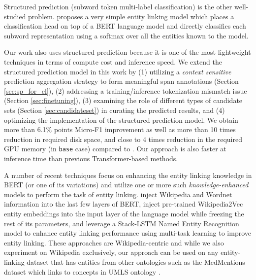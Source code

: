 \documentclass[11pt]{article}
\begin{document}
Structured prediction (subword token multi-label classification) is the other well-studied problem. 
\citet{K19-1063} proposes a very simple entity linking model which places a classification head on top of a BERT language model and directly classifies each subword representation using a softmax over all the entities known to the model. 

Our work also uses structured prediction because it is one of the most lightweight techniques in terms of compute cost and inference speed. We extend the structured prediction model in this work by (1) utilizing a \textit{context sensitive} prediction aggregation strategy to form meaningful span annotations (Section \ref{sec:sp_for_el}), (2) addressing a training/inference tokenization mismatch issue (Section \ref{sec:finetuning}), (3) examining the role of different types of candidate sets (Section \ref{sec:candidateset}) in curating the predicted results, and (4) optimizing the implementation of the structured prediction model. We obtain more than 6.1\% points Micro-F1 improvement as well as more than 10 times reduction in required disk space, and close to 4 times reduction in the required GPU memory (in \texttt{base} case) compared to \citet{K19-1063}. Our approach is also faster at inference time than previous Transformer-based methods.

A number of recent techniques focus on enhancing the entity linking knowledge in BERT (or one of its variations) and utilize one or more such \textit{knowledge-enhanced} models to perform the task of entity linking. \citet{D19-1005} inject Wikipedia and Wordnet information into the last few layers of BERT, \citet{2020.findings-emnlp.71} inject pre-trained Wikipedia2Vec \cite{Wikipedia2Vec} entity embeddings into the input layer of the language model while freezing the rest of its parameters, and \citet{P19-2026} leverage a Stack-LSTM \cite{P15-1033} Named Entity Recognition model to enhance entity linking performance using multi-task learning to improve entity linking. These approaches are Wikipedia-centric and while we also experiment on Wikipedia exclusively, our approach can be used on any entity-linking dataset that has entities from other ontologies such as the MedMentions dataset \cite{MedMentions} which links to concepts in UMLS ontology \cite{UMLS}.
\end{document}
